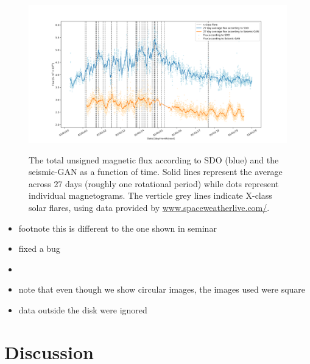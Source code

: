 \documentclass[11pt,a4paper,onecolumn]{report}
\begin{document}
\begin{figure}
  \centering
  \includegraphics[width=\linewidth]{Flux_SDO_Seismic_average.png}
  \label{fig:flux_sdo_seismic}
  \caption{The total unsigned magnetic flux according to SDO (blue) and the
  seismic-GAN as a function of time. Solid lines represent the average across 27
  days (roughly one rotational period) while dots represent individual
  magnetograms. The verticle grey lines indicate X-class solar flares, using
  data provided by \url{www.spaceweatherlive.com/}.}
\end{figure}

\begin{itemize}
  \item footnote this is different to the one shown in seminar
  \item fixed a bug
  \item 
  \end{itemize}

\begin{itemize}
  \item note that even though we show circular images, the images used were square
  \item data outside the disk were ignored
    
\end{itemize}

%
%
%
%
%
\chapter{Discussion}
\label{chap:discussion}
%
%
%
%
%
\end{document}
